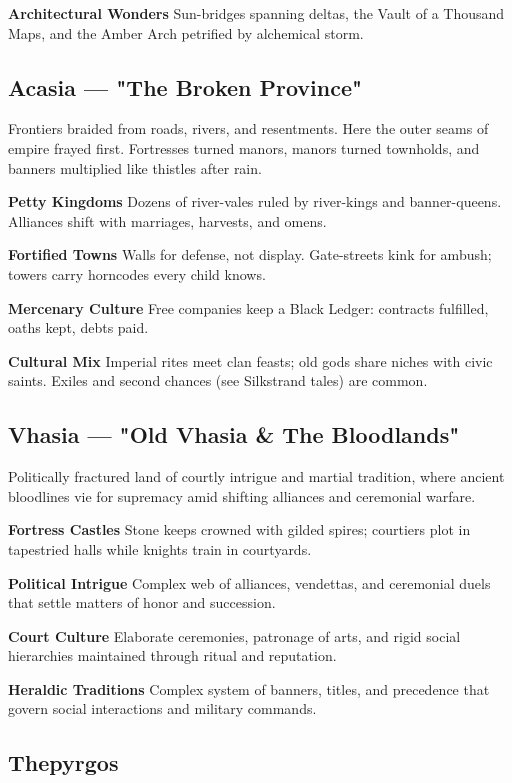 \documentclass[11pt,twoside,openany]{book}
\begin{document}
\textbf{Architectural Wonders} Sun-bridges spanning deltas, the Vault of a Thousand Maps, and the Amber Arch petrified by alchemical storm.

\subsection*{Acasia — "The Broken Province"}

Frontiers braided from roads, rivers, and resentments. Here the outer seams of empire frayed first. Fortresses turned manors, manors turned townholds, and banners multiplied like thistles after rain.

\textbf{Petty Kingdoms} Dozens of river-vales ruled by river-kings and banner-queens. Alliances shift with marriages, harvests, and omens.

\textbf{Fortified Towns} Walls for defense, not display. Gate-streets kink for ambush; towers carry horncodes every child knows.

\textbf{Mercenary Culture} Free companies keep a Black Ledger: contracts fulfilled, oaths kept, debts paid.

\textbf{Cultural Mix} Imperial rites meet clan feasts; old gods share niches with civic saints. Exiles and second chances (see Silkstrand tales) are common.

\subsection*{Vhasia — "Old Vhasia \& The Bloodlands"}

Politically fractured land of courtly intrigue and martial tradition, where ancient bloodlines vie for supremacy amid shifting alliances and ceremonial warfare.

\textbf{Fortress Castles} Stone keeps crowned with gilded spires; courtiers plot in tapestried halls while knights train in courtyards.

\textbf{Political Intrigue} Complex web of alliances, vendettas, and ceremonial duels that settle matters of honor and succession.

\textbf{Court Culture} Elaborate ceremonies, patronage of arts, and rigid social hierarchies maintained through ritual and reputation.

\textbf{Heraldic Traditions} Complex system of banners, titles, and precedence that govern social interactions and military commands.

\subsection*{Thepyrgos}
\end{document}
